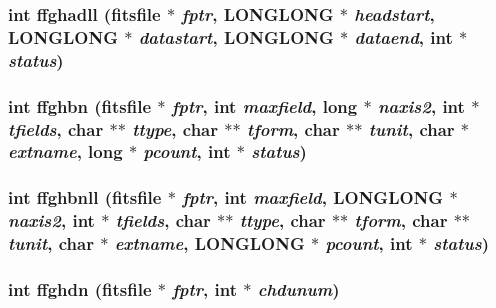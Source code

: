 \subsubsection{\setlength{\rightskip}{0pt plus 5cm}int ffghadll (\bf{fitsfile} $\ast$ {\em fptr}, \bf{LONGLONG} $\ast$ {\em headstart}, \bf{LONGLONG} $\ast$ {\em datastart}, \bf{LONGLONG} $\ast$ {\em dataend}, int $\ast$ {\em status})}\label{test_2roimasker_2fitsio_8h_d9af6a189f3d9ea5cab7da778ed4cdd2}


\subsubsection{\setlength{\rightskip}{0pt plus 5cm}int ffghbn (\bf{fitsfile} $\ast$ {\em fptr}, int {\em maxfield}, long $\ast$ {\em naxis2}, int $\ast$ {\em tfields}, char $\ast$$\ast$ {\em ttype}, char $\ast$$\ast$ {\em tform}, char $\ast$$\ast$ {\em tunit}, char $\ast$ {\em extname}, long $\ast$ {\em pcount}, int $\ast$ {\em status})}\label{test_2roimasker_2fitsio_8h_bc0f689fe3484d2f9c8a9703b058b342}


\subsubsection{\setlength{\rightskip}{0pt plus 5cm}int ffghbnll (\bf{fitsfile} $\ast$ {\em fptr}, int {\em maxfield}, \bf{LONGLONG} $\ast$ {\em naxis2}, int $\ast$ {\em tfields}, char $\ast$$\ast$ {\em ttype}, char $\ast$$\ast$ {\em tform}, char $\ast$$\ast$ {\em tunit}, char $\ast$ {\em extname}, \bf{LONGLONG} $\ast$ {\em pcount}, int $\ast$ {\em status})}\label{test_2roimasker_2fitsio_8h_63346aca0b8254ae989a8c62e45a532a}


\subsubsection{\setlength{\rightskip}{0pt plus 5cm}int ffghdn (\bf{fitsfile} $\ast$ {\em fptr}, int $\ast$ {\em chdunum})}\label{test_2roimasker_2fitsio_8h_b931369499769d33e907da0a87a5f4b6}


